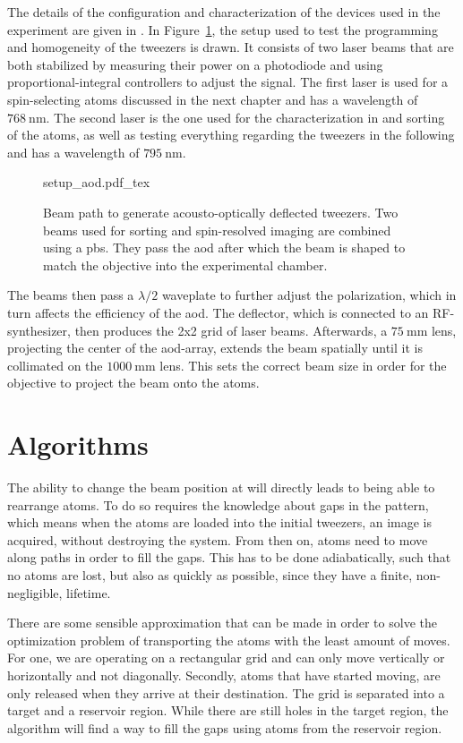The details of the configuration and characterization of the devices used in the experiment are given in \cite{Osterholz2020}.
In Figure~\ref{fig:setup_aod}, the setup used to test the programming and homogeneity of the tweezers is drawn. It consists of two laser beams that are both stabilized by measuring their power on a photodiode and using proportional-integral controllers to adjust the signal. The first laser is used for a spin-selecting atoms discussed in the next chapter and has a wavelength of $\SI{768}{\nano\meter}$. The second laser is the one used for the characterization in \cite{Osterholz2020} and sorting of the atoms, as well as testing everything regarding the tweezers in the following and has a wavelength of $\SI{795}{\nano\meter}$.

\begin{figure}[t]
\label{fig:setup_aod}
\centering
	{setup_aod.pdf_tex}
	\caption{Beam path to generate acousto-optically deflected tweezers. Two beams used for sorting and spin-resolved imaging are combined using a \ac{pbs}. They pass the \ac{aod} after which the beam is shaped to match the objective into the experimental chamber.}
\end{figure}

The beams then pass a $\lambda/2$ waveplate to further adjust the polarization, which in turn affects the efficiency of the \ac{aod}. The deflector, which is connected to an RF-synthesizer, then produces the 2x2 grid of laser beams. Afterwards, a $\SI{75}{\milli\meter}$ lens, projecting the center of the \ac{aod}-array, extends the beam spatially until it is collimated on the $\SI{1000}{\milli\meter}$ lens. This sets the correct beam size in order for the objective to project the beam onto the atoms.

\section{Algorithms}

The ability to change the beam position at will directly leads to being able to rearrange atoms. To do so requires the knowledge about gaps in the pattern, which means when the atoms are loaded into the initial tweezers, an image is acquired, without destroying the system. From then on, atoms need to move along paths in order to fill the gaps. This has to be done adiabatically, such that no atoms are lost, but also as quickly as possible, since they have a finite, non-negligible, lifetime.

There are some sensible approximation that can be made in order to solve the optimization problem of transporting the atoms with the least amount of moves. For one, we are operating on a rectangular grid and can only move vertically or horizontally and not diagonally. Secondly, atoms that have started moving, are only released when they arrive at their destination.
The grid is separated into a target and a reservoir region. While there are still holes in the target region, the algorithm will find a way to fill the gaps using atoms from the reservoir region.

